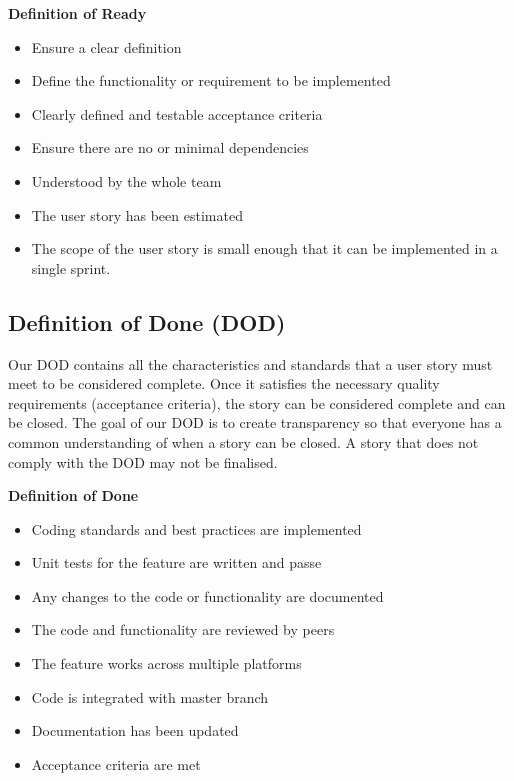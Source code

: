 \textbf{Definition of Ready}
\begin{itemize}
    \item Ensure a clear definition
    \item Define the functionality or requirement to be implemented
    \item Clearly defined and testable acceptance criteria
    \item Ensure there are no or minimal dependencies
    \item Understood by the whole team
    \item The user story has been estimated
    \item The scope of the user story is small enough that it can be implemented in a single sprint.
\end{itemize}
\clearpage

\subsection{Definition of Done (DOD)}
Our DOD contains all the characteristics and standards that a user story must meet to be considered complete.
Once it satisfies the necessary quality requirements (acceptance criteria), the story can be considered complete and can be closed.
The goal of our DOD is to create transparency so that everyone has a common understanding of when a story can be closed.
A story that does not comply with the DOD may not be finalised.

\textbf{Definition of Done}
\begin{itemize}
    \item Coding standards and best practices are implemented
    \item Unit tests for the feature are written and passe
    \item Any changes to the code or functionality are documented
    \item The code and functionality are reviewed by peers
    \item The feature works across multiple platforms
    \item Code is integrated with master branch
    \item Documentation has been updated
    \item Acceptance criteria are met
\end{itemize}
\clearpage

